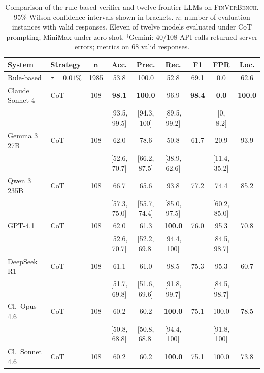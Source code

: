 \documentclass[11pt]{article}
\newcommand{\benchmark}{\textsc{FinVerBench}}
\begin{document}
\begin{table}[t]
\centering
\footnotesize
\caption{Comparison of the rule-based verifier and twelve frontier LLMs on \benchmark{}.
95\% Wilson confidence intervals shown in brackets.
$n$: number of evaluation instances with valid responses.
Eleven of twelve models evaluated under CoT prompting; MiniMax under zero-shot.
$^\dagger$Gemini: 40/108 API calls returned server errors; metrics on 68 valid responses.
}
\label{tab:llm_results}
\begin{tabular}{llccccccc}
\toprule
\textbf{System} & \textbf{Strategy} & $\bm{n}$ & \textbf{Acc.} & \textbf{Prec.} & \textbf{Rec.} & \textbf{F1} & \textbf{FPR} & \textbf{Loc.} \\
\midrule
Rule-based & $\tau=0.01\%$ & 1985 & 53.8 & 100.0 & 52.8 & 69.1 & 0.0 & 62.6 \\
\midrule
Claude Sonnet 4 & CoT & 108 & \textbf{98.1} & \textbf{100.0} & 96.9 & \textbf{98.4} & \textbf{0.0} & \textbf{100.0} \\
 & & & \scriptsize{[93.5, 99.5]} & \scriptsize{[94.3, 100]} & \scriptsize{[89.5, 99.2]} &  & \scriptsize{[0, 8.2]} & \\
Gemma 3 27B & CoT & 108 & 62.0 & 78.6 & 50.8 & 61.7 & 20.9 & 93.9 \\
 & & & \scriptsize{[52.6, 70.7]} & \scriptsize{[66.2, 87.5]} & \scriptsize{[38.9, 62.6]} &  & \scriptsize{[11.4, 35.2]} & \\
Qwen 3 235B & CoT & 108 & 66.7 & 65.6 & 93.8 & 77.2 & 74.4 & 85.2 \\
 & & & \scriptsize{[57.3, 75.0]} & \scriptsize{[55.7, 74.4]} & \scriptsize{[85.0, 97.5]} & & \scriptsize{[60.2, 85.0]} & \\
GPT-4.1 & CoT & 108 & 62.0 & 61.3 & \textbf{100.0} & 76.0 & 95.3 & 70.8 \\
 & & & \scriptsize{[52.6, 70.7]} & \scriptsize{[52.2, 69.8]} & \scriptsize{[94.4, 100]} & & \scriptsize{[84.5, 98.7]} & \\
DeepSeek R1 & CoT & 108 & 61.1 & 61.0 & 98.5 & 75.3 & 95.3 & 60.7 \\
 & & & \scriptsize{[51.7, 69.8]} & \scriptsize{[51.6, 69.6]} & \scriptsize{[91.8, 99.7]} & & \scriptsize{[84.5, 98.7]} & \\
Cl.\ Opus 4.6 & CoT & 108 & 60.2 & 60.2 & \textbf{100.0} & 75.1 & 100.0 & 78.5 \\
 & & & \scriptsize{[50.8, 68.8]} & \scriptsize{[50.8, 68.8]} & \scriptsize{[94.4, 100]} & & \scriptsize{[91.8, 100]} & \\
Cl.\ Sonnet 4.6 & CoT & 108 & 60.2 & 60.2 & \textbf{100.0} & 75.1 & 100.0 & 73.8 \\

\end{tabular}
\end{table}
\end{document}
